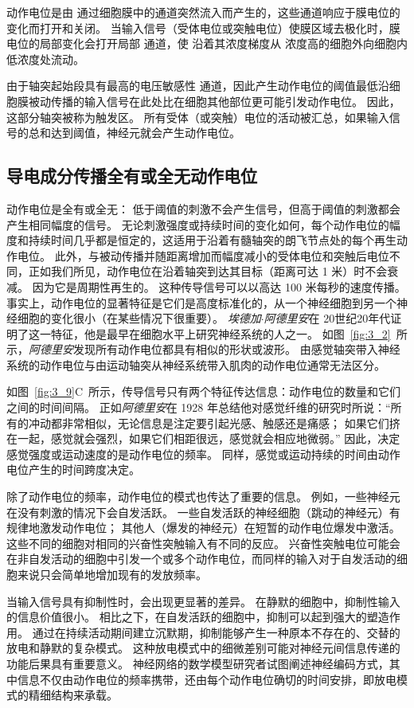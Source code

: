 动作电位是由  通过细胞膜中的通道突然流入而产生的，这些通道响应于膜电位的变化而打开和关闭。 
当输入信号（受体电位或突触电位）使膜区域去极化时，膜电位的局部变化会打开局部  通道，使  沿着其浓度梯度从  浓度高的细胞外向细胞内低浓度处流动。


由于轴突起始段具有最高的电压敏感性 通道，因此产生动作电位的阈值最低沿细胞膜被动传播的输入信号在此处比在细胞其他部位更可能引发动作电位。
因此，这部分轴突被称为触发区。
所有受体（或突触）电位的活动被汇总，如果输入信号的总和达到阈值，神经元就会产生动作电位。


\subsection{导电成分传播全有或全无动作电位}
动作电位是全有或全无：
低于阈值的刺激不会产生信号，但高于阈值的刺激都会产生相同幅度的信号。
无论刺激强度或持续时间的变化如何，每个动作电位的幅度和持续时间几乎都是恒定的，这适用于沿着有髓轴突的朗飞节点处的每个再生动作电位。
此外，与被动传播并随距离增加而幅度减小的受体电位和突触后电位不同，正如我们所见，动作电位在沿着轴突到达其目标（距离可达 1 米）时不会衰减。 
因为它是周期性再生的。
这种传导信号可以以高达 100 米每秒的速度传播。 
事实上，动作电位的显著特征是它们是高度标准化的，从一个神经细胞到另一个神经细胞的变化很小（在某些情况下很重要）。
\textit{埃德加$\cdot$阿德里安}在 20世纪20年代证明了这一特征，他是最早在细胞水平上研究神经系统的人之一。
如图~\ref{fig:3_2}~所示，\textit{阿德里安}发现所有动作电位都具有相似的形状或波形。
由感觉轴突带入神经系统的动作电位与由运动轴突从神经系统带入肌肉的动作电位通常无法区分。


如图~\ref{fig:3_9}C~所示，传导信号只有两个特征传达信息：动作电位的数量和它们之间的时间间隔。 
正如\textit{阿德里安}在 1928 年总结他对感觉纤维的研究时所说：“所有的冲动都非常相似，无论信息是注定要引起光感、触感还是痛感；
如果它们挤在一起，感觉就会强烈，如果它们相距很远，感觉就会相应地微弱。” 
因此，决定感觉强度或运动速度的是动作电位的频率。
同样，感觉或运动持续的时间由动作电位产生的时间跨度决定。


除了动作电位的频率，动作电位的模式也传达了重要的信息。
例如，一些神经元在没有刺激的情况下会自发活跃。
一些自发活跃的神经细胞（跳动的神经元）有规律地激发动作电位；
其他人（爆发的神经元）在短暂的动作电位爆发中激活。
这些不同的细胞对相同的兴奋性突触输入有不同的反应。
兴奋性突触电位可能会在非自发活动的细胞中引发一个或多个动作电位，而同样的输入对于自发活动的细胞来说只会简单地增加现有的发放频率。


当输入信号具有抑制性时，会出现更显著的差异。
在静默的细胞中，抑制性输入的信息价值很小。 
相比之下，在自发活跃的细胞中，抑制可以起到强大的塑造作用。
通过在持续活动期间建立沉默期，抑制能够产生一种原本不存在的、交替的放电和静默的复杂模式。
这种放电模式中的细微差别可能对神经元间信息传递的功能后果具有重要意义。
神经网络的数学模型研究者试图阐述神经编码方式，其中信息不仅由动作电位的频率携带，还由每个动作电位确切的时间安排，即放电模式的精细结构来承载。


